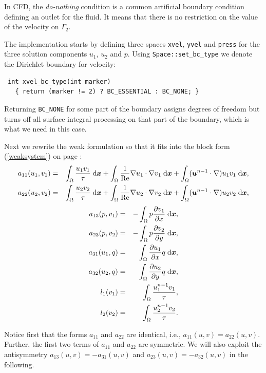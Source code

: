 In CFD, the {\it do-nothing} condition is a common artificial boundary condition defining
an outlet for the fluid. It means that there is no restriction on the value
of the velocity on $\Gamma_2$.

The implementation starts by defining three spaces {\tt xvel}, {\tt yvel} and {\tt press}
for the three solution components $u_1$, $u_2$ and $p$. Using {\tt Space::set\_bc\_type}
we denote the Dirichlet boundary for velocity:
\begin{lstlisting}
 int xvel_bc_type(int marker)
   { return (marker != 2) ? BC_ESSENTIAL : BC_NONE; }
\end{lstlisting}
Returning {\tt BC\_NONE} for some part of the boundary assigns degrees of freedom but turns
off all surface integral processing on that part of the boundary, which is what we need
in this case.

Next we rewrite the weak formulation so that it fits into the block form (\ref{weaksystem})
on page \pageref{weaksystem}:
\begin{eqnarray*}
  a_{11}(u_1, v_1) &=& \int_\Omega \frac{u_1 v_1}{\tau} \;\mbox{d}\mbox{\boldmath $x$} +
                       \int_\Omega \frac{1}{\rm Re} \nabla u_1 \cdot \nabla v_1 \;\mbox{d}\mbox{\boldmath $x$} +
                       \int_\Omega (\mbox{\boldmath $u$}^{n-1} \cdot \nabla) u_1 v_1 \;\mbox{d}\mbox{\boldmath $x$}, \\
  a_{22}(u_2, v_2) &=& \int_\Omega \frac{u_2 v_2}{\tau} \;\mbox{d}\mbox{\boldmath $x$} +
                       \int_\Omega \frac{1}{\rm Re} \nabla u_2 \cdot \nabla v_2 \;\mbox{d}\mbox{\boldmath $x$} +
                       \int_\Omega (\mbox{\boldmath $u$}^{n-1} \cdot \nabla) u_2 v_2 \;\mbox{d}\mbox{\boldmath $x$},
\end{eqnarray*}
\begin{eqnarray*}
  a_{13}(p, v_1) &=& -\int_\Omega p \frac{\partial v_1}{\partial x} \;\mbox{d}\mbox{\boldmath $x$}, \\
  a_{23}(p, v_2) &=& -\int_\Omega p \frac{\partial v_2}{\partial y} \;\mbox{d}\mbox{\boldmath $x$}, \\
  a_{31}(u_1, q) &=&  \int_\Omega \frac{\partial u_1}{\partial x} q \;\mbox{d}\mbox{\boldmath $x$}, \\
  a_{32}(u_2, q) &=&  \int_\Omega \frac{\partial u_2}{\partial y} q \;\mbox{d}\mbox{\boldmath $x$}, \\
  l_1(v_1) &=& \int_\Omega \frac{u^{n-1}_1 v_1}{\tau}, \\
  l_2(v_2) &=& \int_\Omega \frac{u^{n-1}_2 v_2}{\tau}.
\end{eqnarray*}

Notice first that the forms $a_{11}$ and $a_{22}$ are identical, i.e., $a_{11}(u,v) = a_{22}(u,v)$.
Further, the first two terms of $a_{11}$ and $a_{22}$ are symmetric. We will also exploit the
antisymmetry $a_{13}(u,v) = -a_{31}(u,v)$ and $a_{23}(u,v) = -a_{32}(u,v)$ in the following.

